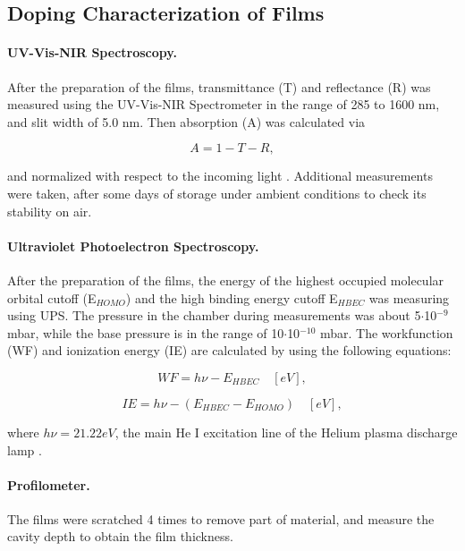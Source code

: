 \subsection{Doping Characterization of Films}

\paragraph{UV-Vis-NIR Spectroscopy.}After the preparation of the films, transmittance (T) and reflectance (R) was measured using the UV-Vis-NIR Spectrometer in the range of 285 to 1600 nm, and slit width of 5.0 nm. Then absorption (A) was calculated via


\begin{equation}\label{eq:abs}
	A = 1 - T - R,
\end{equation}

and normalized with respect to the incoming light \cite{uvvis}. Additional measurements were taken, after some days of storage under ambient conditions to check its stability on air.

\paragraph{Ultraviolet Photoelectron Spectroscopy.}After the preparation of the films, %
the energy of the highest occupied molecular orbital cutoff (E$_{HOMO}$) and the high binding energy cutoff E$_{HBEC}$ was measuring using UPS. The pressure in the chamber during measurements was about 5$\cdot$10$^{-9}$ mbar, while the base pressure is in the range of 10$\cdot$10$^{-10}$ mbar. The workfunction (WF) and ionization energy (IE) are calculated by using the following equations:

\begin{equation}\label{eq:wf}
	WF = h\nu - E_{HBEC} \quad [eV],
\end{equation}

\begin{equation}\label{eq:ie}
	IE = h\nu - (E_{HBEC}-E_{HOMO}) \quad [eV],
\end{equation}

where $h\nu = 21.22 eV$, the main He I excitation line of the Helium plasma discharge lamp \cite{buchholtzDopingPropertiesNovel2021}. 

\paragraph{Profilometer.}The films were scratched 4 times to remove part of material, and measure the cavity depth to obtain the film thickness.

